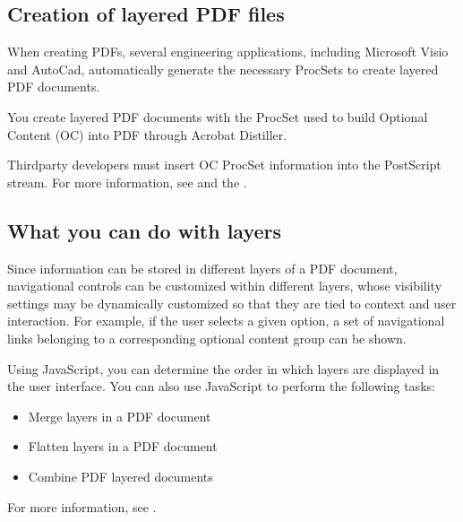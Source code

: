 \documentclass[letterpaper,12pt,english,openany,oneside]{sphinxmanual}
\begin{document}
\subsection{Creation of layered PDF files}
\label{\detokenize{Overview_Metadata:creation-of-layered-pdf-files}}
When creating PDFs, several engineering applications, including Microsoft Visio and AutoCad, automatically generate the necessary ProcSets to create layered PDF documents.

You create layered PDF documents with the ProcSet used to build Optional Content (OC) into PDF through Acrobat Distiller.

Third\sphinxhyphen{}party developers must insert OC ProcSet information into the PostScript stream. For more information, see  and the  .




\subsection{What you can do with layers}
\label{\detokenize{Overview_Metadata:what-you-can-do-with-layers}}
Since information can be stored in different layers of a PDF document, navigational controls can be customized within different layers, whose visibility settings may be dynamically customized so that they are tied to context and user interaction. For example, if the user selects a given option, a set of navigational links belonging to a corresponding optional content group can be shown.

Using JavaScript, you can determine the order in which layers are displayed in the user interface. You can also use JavaScript to perform the following tasks:
\begin{itemize}
\item {} 
Merge layers in a PDF document

\item {} 
Flatten layers in a PDF document

\item {} 
Combine PDF layered documents

\end{itemize}

For more information, see  .
\end{document}
